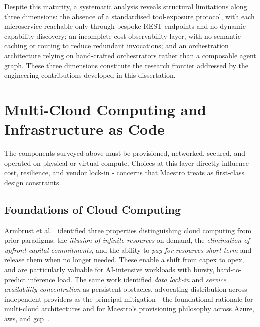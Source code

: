 Despite this maturity, a systematic analysis reveals structural limitations along three dimensions: the absence of a standardised tool-exposure protocol, with each microservice reachable only through bespoke REST endpoints and no dynamic capability discovery; an incomplete cost-observability layer, with no semantic caching or routing to reduce redundant invocations; and an orchestration architecture relying on hand-crafted orchestrators rather than a composable agent graph. These three dimensions constitute the research frontier addressed by the engineering contributions developed in this dissertation.

\section{Multi-Cloud Computing and Infrastructure as Code}
\label{sec:multi-cloud}

The components surveyed above must be provisioned, networked, secured, and operated on physical or virtual compute. Choices at this layer directly influence cost, resilience, and vendor lock-in - concerns that Maestro treats as first-class design constraints.

\subsection{Foundations of Cloud Computing}
\label{subsec:cloud-foundations}

Armbrust et al.~\cite{armbrust2010view} identified three properties distinguishing cloud computing from prior paradigms: the \emph{illusion of infinite resources} on demand, the \emph{elimination of upfront capital commitments}, and the ability to \emph{pay for resources short-term} and release them when no longer needed. These enable a shift from \acrfull{capex} to \acrfull{opex}, and are particularly valuable for AI-intensive workloads with bursty, hard-to-predict inference load. The same work identified \emph{data lock-in} and \emph{service availability concentration} as persistent obstacles, advocating distribution across independent providers as the principal mitigation - the foundational rationale for multi-cloud architectures and for Maestro's provisioning philosophy across Azure, \acrfull{aws}, and \acrfull{gcp}~\cite{armbrust2010view,closer2025maestro}.


